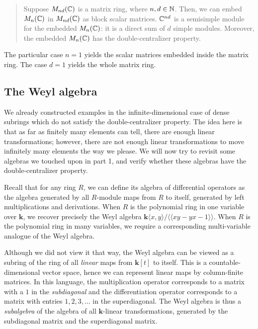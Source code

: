 \documentclass[a4paper]{amsart}
\newcommand{\field}{\mathbf{k}}
\begin{document}
\begin{quote}
  Suppose $M_{nd}(\mathbb{C})$ is a matrix ring, where $n,d \in \mathbb{N}$. Then, we
  can embed $M_n(\mathbb{C})$ in $M_{nd}(\mathbb{C})$ as block scalar
  matrices. $\mathbb{C}^{nd}$ is a semisimple module for the embedded
  $M_n(\mathbb{C})$: it is a direct sum of $d$ simple modules. Moreover,
  the embedded $M_n(\mathbb{C})$ has the double-centralizer property.
\end{quote}

The particular case $n=1$ yields the scalar matrices embedded inside
the matrix ring. The case $d = 1$ yields the whole matrix ring. 

\subsection{The Weyl algebra}

We already constructed examples in the infinite-dimensional case of
dense subrings which do not satisfy the double-centralizer
property. The idea here is that as far as finitely many elements can
tell, there are enough linear transformations; however, there are not
enough linear transformations to move infinitely many elements the way
we please. We will now try to revisit some algebras we touched upon in
part 1, and verify whether these algebras have the double-centralizer
property.

Recall that for any ring $R$, we can define its algebra of
differential operators as the algebra generated by all $R$-module maps
from $R$ to itself, generated by left multiplications and
derivations. When $R$ is the polynomial ring in one variable over
$\field$, we recover precisely the Weyl algebra $\field\langle x,y
\rangle/ \langle \langle xy -yx - 1\rangle \rangle$. When $R$ is the
polynomial ring in many variables, we require a corresponding
multi-variable analogue of the Weyl algebra.

Although we did not view it that way, the Weyl algebra can be viewed
as a subring of the ring of all {\em linear} maps from $\field[t]$ to
itself.  This is a countable-dimensional vector space, hence we can
represent linear maps by column-finite matrices. In this language, the
multiplication operator corresponds to a matrix with a $1$ in the {\em
  subdiagonal} and the differentiation operator corresponds to a
matrix with entries $1,2,3,\ldots$ in the superdiagonal. The Weyl
algebra is thus a {\em subalgebra} of the algebra of all
$\field$-linear transformations, generated by the subdiagonal matrix
and the superdiagonal matrix.
\end{document}
